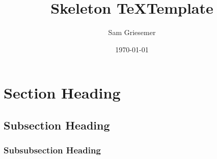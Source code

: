 \documentclass{article}
\title{Skeleton \TeX Template}
\author{Sam Griesemer}
\date{\today}
\begin{document}
\maketitle
\tableofcontents
\newpage

\section{Section Heading}
\subsection{Subsection Heading}
\subsubsection{Subsubsection Heading}
\end{document}
